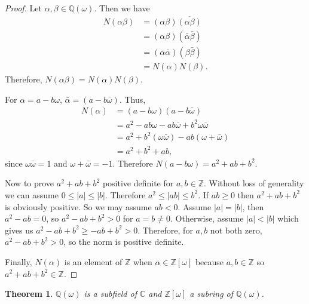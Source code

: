 \documentclass[12pt]{amsart}
\newtheorem{theorem}{Theorem}
\theoremstyle{definition}
\theoremstyle{remark}
\begin{document}
\begin{proof}
    Let $\alpha,\beta\in\mathbb{Q}(\omega)$. Then we have 
    \begin{align*}
        N(\alpha\beta) &= (\alpha\beta)\overline{(\alpha\beta)}\\
        &= (\alpha\beta)(\bar{\alpha}\bar{\beta})\\
        &= (\alpha\bar{\alpha})(\beta\bar{\beta})\\
        &= N(\alpha)N(\beta).
    \end{align*}
    Therefore, $N(\alpha\beta)=N(\alpha)N(\beta)$.
    
    For $\alpha = a-b\omega$, $\bar{\alpha} = (a-b\bar{\omega})$.
    Thus,
    \begin{align*}
        N(\alpha) &= (a-b\omega)(a-b\bar{\omega}) \\
        &= a^2 - ab\omega - ab\bar\omega + b^2\omega\bar{\omega}\\
        &= a^2 + b^2(\omega\bar{\omega}) - ab(\omega + \bar{\omega})\\
        &= a^2 + b^2 + ab,
    \end{align*}
    since $\omega\bar{\omega}=1$ and $\omega + \bar{\omega} = -1$. Therefore $N(a-b\omega) = a^2 +ab +b^2$.
    
    Now to prove $a^2 + ab +b^2$ positive definite for $a,b\in\mathbb{Z}$. Without loss of generality we can assume $0\leq|a|\leq|b|$. Therefore $a^2\leq |ab| \leq b^2$. If $ab\geq0$ then $a^2+ab+b^2$ is obviously positive. So we may assume $ab<0$. Assume $|a|=|b|$, then $a^2-ab = 0$, so $a^2-ab+b^2>0$ for $a=b\not=0$. Otherwise, assume $|a|<|b|$ which gives us $a^2-ab+b^2\geq -ab+b^2>0$. Therefore, for $a,b$ not both zero, $a^2-ab+b^2>0$, so the norm is positive definite.
    
    Finally, $N(\alpha)$ is an element of $\mathbb{Z}$ when $\alpha\in\mathbb{Z}[\omega]$ because $a,b\in\mathbb{Z}$ so $a^2+ab+b^2\in\mathbb{Z}$.
\end{proof}
\begin{theorem}\label{Thm:Subfield}
    $\mathbb{Q}(\omega)$ is a subfield of $\mathbb{C}$ and $\mathbb{Z}[\omega]$ a subring of $\mathbb{Q}(\omega)$.
\end{theorem}
\end{document}

